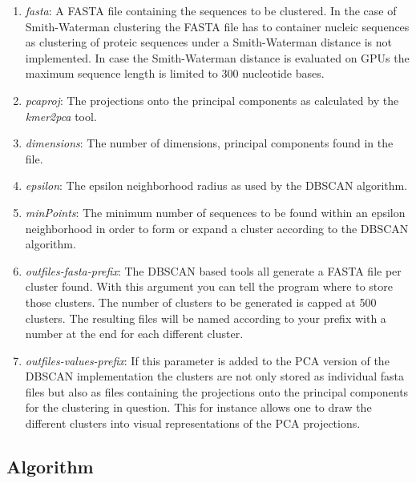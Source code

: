 \begin{enumerate}
  \item \emph{fasta}: A FASTA file containing the sequences to be
    clustered. In the case of Smith-Waterman clustering the FASTA file
    has to container nucleic sequences as clustering of proteic
    sequences under a Smith-Waterman distance is not implemented. In
    case the Smith-Waterman distance is evaluated on GPUs the maximum
    sequence length is limited to 300 nucleotide bases.
  \item \emph{pcaproj}: The projections onto the principal components
    as calculated by the \emph{kmer2pca} tool. 
  \item \emph{dimensions}: The number of dimensions, principal
    components found in the file.
  \item \emph{epsilon}: The epsilon neighborhood radius as used by the DBSCAN
    \cite{dbscan} algorithm.
  \item \emph{minPoints}: The minimum number of sequences to be found
    within an epsilon neighborhood in order to form or expand a
    cluster according to the DBSCAN algorithm.
  \item \emph{outfiles-fasta-prefix}: The DBSCAN based tools all
    generate a FASTA file per cluster found. With this argument you
    can tell the program where to store those clusters. The number of
    clusters to be generated is capped at 500 clusters. The resulting
    files will be named according to your prefix with a number at the
    end for each different cluster.
  \item \emph{outfiles-values-prefix}: If this parameter is added to
    the PCA version of the DBSCAN implementation the clusters are not
    only stored as individual fasta files but also as files containing
    the projections onto the principal components for the clustering
    in question. This for instance allows one to draw the different
    clusters into visual representations of the PCA projections.
\end{enumerate}

\subsection{Algorithm} \label{sec-dbscan-algorithm}

